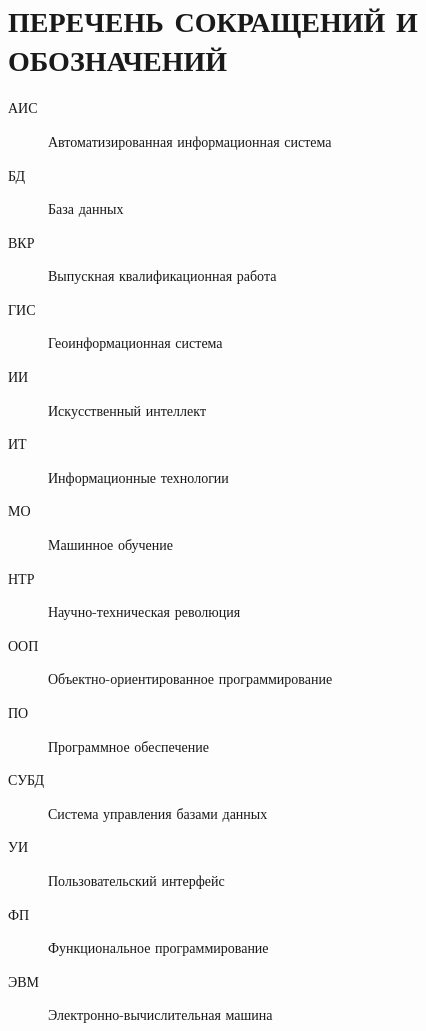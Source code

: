 \chapter*{ПЕРЕЧЕНЬ СОКРАЩЕНИЙ И ОБОЗНАЧЕНИЙ}

\vspace{1cm}

\begin{description}
    \item[АИС] Автоматизированная информационная система
    \item[БД] База данных
    \item[ВКР] Выпускная квалификационная работа
    \item[ГИС] Геоинформационная система
    \item[ИИ] Искусственный интеллект
    \item[ИТ] Информационные технологии
    \item[МО] Машинное обучение
    \item[НТР] Научно-техническая революция
    \item[ООП] Объектно-ориентированное программирование
    \item[ПО] Программное обеспечение
    \item[СУБД] Система управления базами данных
    \item[УИ] Пользовательский интерфейс
    \item[ФП] Функциональное программирование
    \item[ЭВМ] Электронно-вычислительная машина
\end{description}
